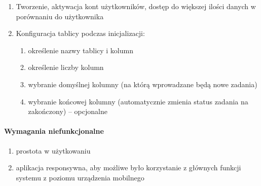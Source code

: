 \begin{enumerate} 
	\item Tworzenie, aktywacja kont użytkowników, dostęp do większej ilości danych w porównaniu do użytkownika
	\item Konfiguracja tablicy podczas inicjalizacji:
	\begin{enumerate}[leftmargin=3em]
		\item określenie nazwy tablicy i kolumn
		\item określenie liczby kolumn
		\item wybranie domyślnej kolumny (na którą wprowadzane będą nowe zadania)
		\item wybranie końcowej kolumny (automatycznie zmienia status zadania na zakończony) –  opcjonalne
	\end{enumerate}
	
\end{enumerate}

\paragraph{Wymagania niefunkcjonalne}
\begin{enumerate}
	\item prostota w użytkowaniu
	\item aplikacja responsywna, aby możliwe było korzystanie z głównych funkcji systemu z poziomu urządzenia mobilnego

\end{enumerate}

\clearpage

